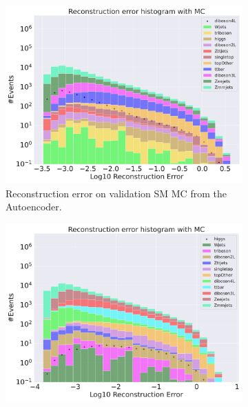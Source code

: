 \begin{figure}[h!]
    \centering
    \begin{subfigure}{.8\textwidth}
        \includegraphics[width=\textwidth]{Figures/AE_testing/big/b_data_recon_big_rm3_feats_sig_diboson4L.pdf}
        \caption{Reconstruction error on validation SM MC from the Autoencoder. }
        \label{fig:ae_big_diboson4l}
    \end{subfigure}
    \hfill
    \begin{subfigure}{.8\textwidth}
        \includegraphics[width=\textwidth]{Figures/AE_testing/big/b_data_recon_big_rm3_feats_sig_higgs.pdf}
        \caption{}
        \label{fig:ae_big_higgs}
    \end{subfigure}
    \hfill        
    \caption{ }
    \label{fig:ae_big_channel2}
\end{figure}

